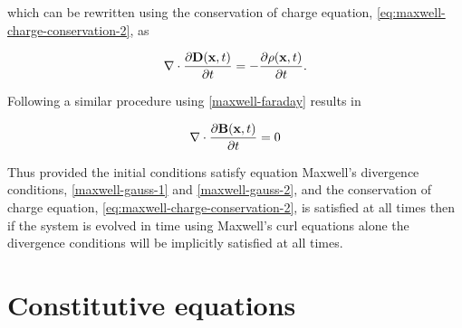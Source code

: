 which can be rewritten using the conservation of charge equation, \eqref{eq:maxwell-charge-conservation-2}, as

$$
\nabla \cdot \frac{\partial \mathbf{D}(\mathbf{x}, t)}{\partial t} = - \frac{\partial  \rho (\mathbf{x},t)}{\partial t}.
$$

Following a similar procedure using \eqref{maxwell-faraday} results in

$$
\nabla \cdot \frac{\partial  \mathbf{B}(\mathbf{x}, t)}{\partial t} = 0
$$

Thus provided the initial conditions satisfy equation Maxwell's divergence conditions, \eqref{maxwell-gauss-1} and \eqref{maxwell-gauss-2}, and the conservation of charge equation, \eqref{eq:maxwell-charge-conservation-2}, is satisfied at all times then if the system is evolved in time using Maxwell's curl equations alone the divergence conditions will be implicitly satisfied at all times.

\section{Constitutive equations}

